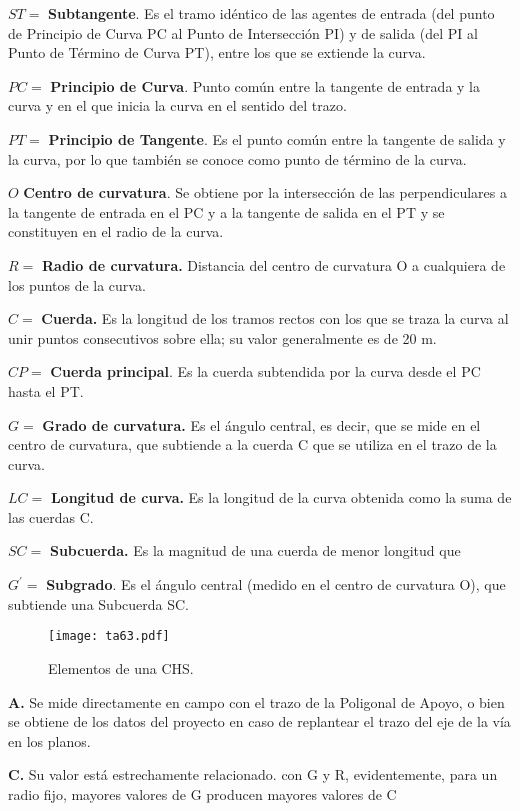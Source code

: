 $ST=$ \textbf{Subtangente}. Es el tramo idéntico de las agentes de entrada (del punto de Principio de Curva PC al Punto de Intersección PI) y de salida (del PI al Punto de Término de Curva PT), entre los que se extiende la curva.

$PC=$ \textbf{Principio de Curva}. Punto común entre la tangente de entrada y la curva y en el que inicia la curva en el sentido del trazo.

$PT=$ \textbf{Principio de Tangente}. Es el punto común entre la tangente de salida y la curva, por lo que también se conoce como punto de término de la curva.

$O$ \textbf{Centro de curvatura}. Se obtiene por la intersección de las perpendiculares a la tangente de entrada en el PC y a la tangente de salida en el PT y se constituyen en el radio de la curva.

$R=$ \textbf{Radio de curvatura.} Distancia del centro de curvatura O a cualquiera de los puntos de la curva.

$C=$ \textbf{Cuerda.} Es la longitud de los tramos rectos con los que se traza la curva al unir puntos consecutivos sobre ella; su valor generalmente es de 20 m.

$CP=$ \textbf{Cuerda principal}. Es la cuerda subtendida por la curva desde el PC hasta el PT.

$G=$ \textbf{Grado de curvatura.} Es el ángulo central, es decir, que se mide en el centro de curvatura, que subtiende a la cuerda C que se utiliza en el trazo de la curva.

$LC=$ \textbf{Longitud de curva.} Es la longitud de la curva obtenida como la suma de las cuerdas C.

$SC=$ \textbf{Subcuerda.} Es la magnitud de una cuerda de menor longitud que

$G^{\prime}=$ \textbf{Subgrado}. Es el ángulo central (medido en el centro de curvatura O), que subtiende una Subcuerda SC.

\begin{figure}[h!]
\centering
  \texttt{[image: ta63.pdf]}
  \caption{Elementos de una CHS.}
  \label{ta63}
\end{figure}

\textbf{A.} Se mide directamente en campo con el trazo de la Poligonal de Apoyo, o bien se obtiene de los datos del proyecto en caso de replantear el trazo del eje de la vía en los planos.

\textbf{C.} Su valor está estrechamente relacionado. con G y R, evidentemente, para un radio fijo, mayores valores de G producen mayores valores de C

